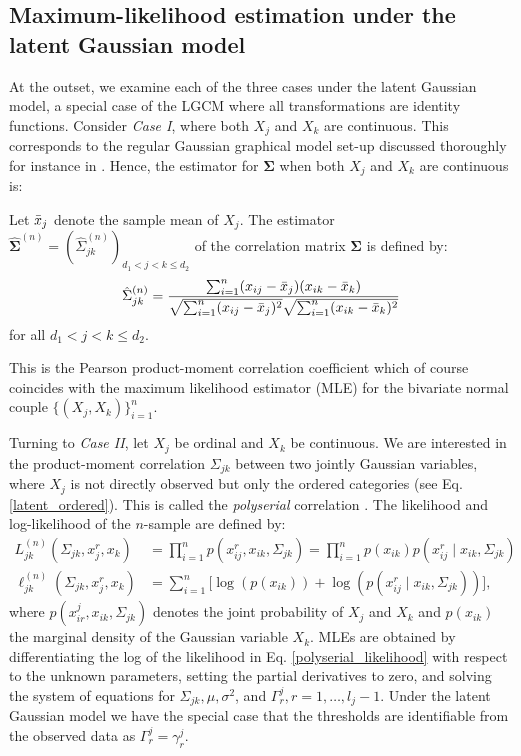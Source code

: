 \subsection{Maximum-likelihood estimation under the latent Gaussian model}\label{sec::latent_gaussian}

At the outset, we examine each of the three cases under the latent Gaussian model, a special case of the LGCM where all transformations are identity functions. Consider \textit{Case I}, where both $X_j$ and $X_k$ are continuous. This corresponds to the regular Gaussian graphical model set-up discussed thoroughly for instance in \citet{Ravikumar11}. Hence, the estimator for $\mathbf\Sigma$ when both $X_j$ and $X_k$ are continuous is:
\begin{definition}\label{def1}
    Let $\Bar{x}_j$ denote the sample mean of $X_j$. The estimator $\hat{\mathbf{\Sigma}}^{(n)} = (\hat{\Sigma}_{jk}^{(n)})_{d_1 < j < k\leq d_2}$ of the correlation matrix $\mathbf{\Sigma}$ is defined by:
    \begin{equation}
            \hat{\Sigma}_{jk}^{(n)} = \frac{\sum_{i=1}^n(x_{ij}- \Bar{x}_j)(x_{ik}- \Bar{x}_k)}{\sqrt{\sum_{i=1}^n(x_{ij}- \Bar{x}_j)^2} \sqrt{\sum_{i=1}^n(x_{ik}- \Bar{x}_k)^2}}
    \end{equation}
    for all $d_1 < j < k \leq d_2$.
\end{definition}
This is the Pearson product-moment correlation coefficient which of course coincides with the maximum likelihood estimator (MLE) for the bivariate normal couple $\{(X_j, X_k)\}_{i=1}^n$.

Turning to \textit{Case II}, let $X_j$ be ordinal and $X_k$ be continuous. We are interested in the product-moment correlation $\Sigma_{jk}$ between two jointly Gaussian variables, where $X_j$ is not directly observed but only the ordered categories (see Eq. \eqref{latent_ordered}). This is called the \textit{polyserial} correlation \citep{Olsson82}. The likelihood and log-likelihood of the $n$-sample are defined by:
\begin{equation}\label{polyserial_likelihood}
    \begin{split}
        L_{jk}^{(n)}(\Sigma_{jk}, x_j^r,x_k) &= \prod_{i=1}^n p(x^r_{ij},x_{ik}, \Sigma_{jk}) = \prod_{i=1}^n p(x_{ik})p(x^r_{ij} \mid x_{ik}, \Sigma_{jk}) \\
        \ell_{jk}^{(n)}(\Sigma_{jk}, x^r_j,x_k) &= \sum_{i=1}^n \big[\log(p(x_{ik})) + \log(p(x^r_{ij} \mid x_{ik}, \Sigma_{jk}))\big],
    \end{split}
\end{equation}
where $p(x^j_{ir},x_{ik}, \Sigma_{jk})$ denotes the joint probability of  $X_j$ and $X_k$ and $p(x_{ik})$ the marginal density of the Gaussian variable $X_k$. MLEs are obtained by differentiating the log of the likelihood in Eq. \eqref{polyserial_likelihood} with respect to the unknown parameters, setting the partial derivatives to zero, and solving the system of equations for $\Sigma_{jk}, \mu, \sigma^2$, and $\Gamma^j_r, r = 1, \dots, l_j-1$. Under the latent Gaussian model we have the special case that the thresholds are identifiable from the observed data as \(\Gamma^j_r = \gamma^j_r\).

